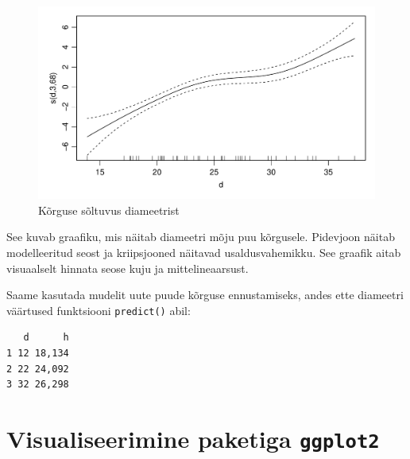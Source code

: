 \documentclass[
]{book}
\newenvironment{Shaded}{\begin{snugshade}}{\end{snugshade}}
\newcommand{\AttributeTok}[1]{\textcolor[rgb]{0.13,0.29,0.53}{#1}}
\newcommand{\CommentTok}[1]{\textcolor[rgb]{0.56,0.35,0.01}{\textit{#1}}}
\newcommand{\DecValTok}[1]{\textcolor[rgb]{0.00,0.00,0.81}{#1}}
\newcommand{\FunctionTok}[1]{\textcolor[rgb]{0.13,0.29,0.53}{\textbf{#1}}}
\newcommand{\NormalTok}[1]{#1}
\newcommand{\OtherTok}[1]{\textcolor[rgb]{0.56,0.35,0.01}{#1}}
\newcommand{\SpecialCharTok}[1]{\textcolor[rgb]{0.81,0.36,0.00}{\textbf{#1}}}
\renewenvironment{Shaded} {\begin{snugshade}\footnotesize} {\end{snugshade}}
\begin{document}
\begin{figure}[H]
\includegraphics[width=0.8\linewidth]{_main_files/figure-latex/unnamed-chunk-75-1} \caption{Kõrguse sõltuvus diameetrist}\label{fig:unnamed-chunk-75}
\end{figure}

See kuvab graafiku, mis näitab diameetri mõju puu kõrgusele. Pidevjoon näitab modelleeritud seost ja kriipsjooned näitavad usaldusvahemikku. See graafik aitab visuaalselt hinnata seose kuju ja mittelineaarsust.

Saame kasutada mudelit uute puude kõrguse ennustamiseks, andes ette diameetri väärtused funktsiooni \texttt{predict()} abil:

\begin{Shaded}
\end{Shaded}

\begin{verbatim}
   d      h
1 12 18,134
2 22 24,092
3 32 26,298
\end{verbatim}

\section{\texorpdfstring{Visualiseerimine paketiga \texttt{ggplot2}}{Visualiseerimine paketiga ggplot2}}\label{visualiseerimine-paketiga-ggplot2}
\end{document}
